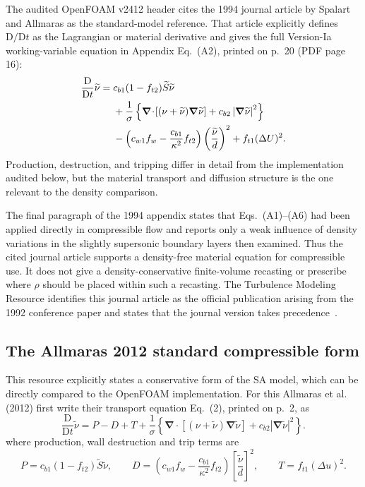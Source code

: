 \documentclass[11pt]{article}
\newcommand{\SADt}{\frac{\mathrm D}{\mathrm Dt}}
\newcommand{\SAgrad}{\boldsymbol{\nabla}}
\newcommand{\SAdiv}{\boldsymbol{\nabla}\!\cdot}
\newcommand{\SAOF}{OpenFOAM}
\begin{document}
The audited \SAOF{} v2412 header cites the 1994 journal article by Spalart and
Allmaras as the standard-model reference.  That article explicitly defines
\(\mathrm D/\mathrm Dt\) as the Lagrangian or material derivative and gives the
full Version-Ia working-variable equation in Appendix Eq.~(A2), printed on
p.~20 (PDF page 16):
\begin{align}
  \SADt\widetilde{\nu}
  ={}&c_{b1}(1-f_{t2})\widetilde S\widetilde{\nu} \notag\\
  &+\frac{1}{\sigma}
   \left\{
     \SAdiv\!\left[(\nu+\widetilde{\nu})\SAgrad\widetilde{\nu}\right]
     +c_{b2}\left|\SAgrad\widetilde{\nu}\right|^2
   \right\} \notag\\
  &-\left(c_{w1}f_w-\frac{c_{b1}}{\kappa^2}f_{t2}\right)
    \left(\frac{\widetilde{\nu}}{d}\right)^2
  +f_{t1}(\Delta U)^2.
  \label{eq:sa-1994-material}
\end{align}
Production, destruction, and tripping differ in detail from the implementation
audited below, but the material transport and diffusion structure is the one
relevant to the density comparison.

The final paragraph of the 1994 appendix states that Eqs.~(A1)--(A6) had been
applied directly in compressible flow and reports only a weak influence of
density variations in the slightly supersonic boundary layers then examined.
Thus the cited journal article supports a density-free material equation for
compressible use.  It does not give a density-conservative finite-volume
recasting or prescribe where \(\rho\) should be placed within such a recasting.
The Turbulence Modeling Resource identifies this journal article as the
official publication arising from the 1992 conference paper and states that
the journal version takes precedence~\cite{SpalartAllmaras1994,NASATMRSA}.

\subsection{The Allmaras 2012 standard compressible form}
This resource explicitly states a conservative form of the SA model, which can be directly compared to the \SAOF{} implementation.
For this Allmaras et al. (2012) first write their transport equation Eq.~(2), printed on p.~2, as
\begin{equation}
  \SADt\widetilde{\nu}
  =P-D+T
  +\frac{1}{\sigma}
   \left\{
     \SAdiv\!\left[(\nu+\widetilde{\nu})\SAgrad\widetilde{\nu}\right]
     +c_{b2}\left|\SAgrad\widetilde{\nu}\right|^2
   \right\}.
  \label{eq:sa-paper-material}
\end{equation}
where production, wall destruction and trip terms are
\begin{equation*}
  P=c_{b1}(1-f_{t2})\widetilde{S}\widetilde{\nu},
  \qquad
  D=\left(c_{w1}f_w-\frac{c_{b1}}{\kappa^2}f_{t2}\right)
    \left[\frac{\widetilde{\nu}}{d}\right]^2,
  \qquad
  T=f_{t1}(\Delta u)^2.
\end{equation*}
\end{document}
